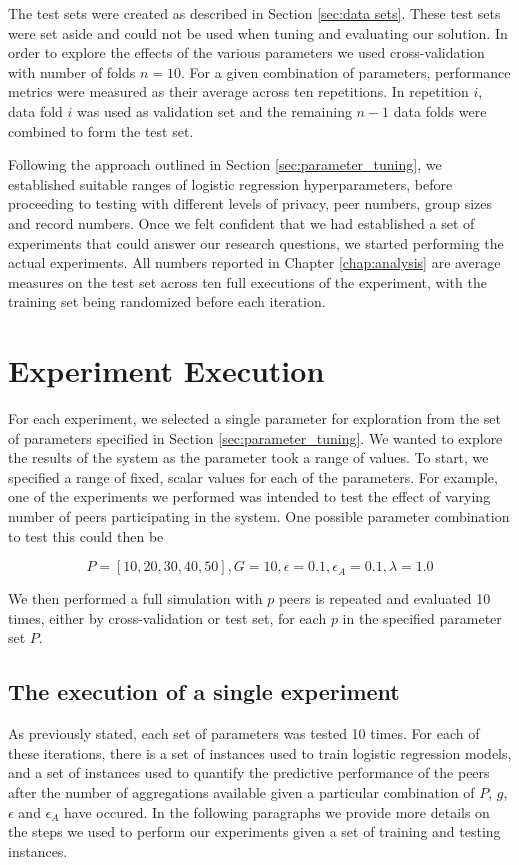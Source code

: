 The test sets were created as described in Section \ref{sec:data sets}. These test sets were set aside and could not be used when tuning and evaluating our solution. In order to explore the effects of the various parameters we used cross-validation with number of folds $n=10$. For a given combination of parameters, performance metrics were measured as their average across ten repetitions. In repetition $i$, data fold $i$ was used as validation set and the remaining $n-1$ data folds were combined to form the test set.

Following the approach outlined in Section \ref{sec:parameter_tuning}, we established suitable ranges of logistic regression hyperparameters, before proceeding to testing with different levels of privacy, peer numbers, group sizes and record numbers. Once we felt confident that we had established a set of experiments that could answer our research questions, we started performing the actual experiments. All numbers reported in Chapter \ref{chap:analysis} are average measures on the test set across ten full executions of the experiment, with the training set being randomized before each iteration.

\section{Experiment Execution}

For each experiment, we selected a single parameter for exploration from the set of parameters specified in Section \ref{sec:parameter_tuning}. We wanted to explore the results of the system as the parameter took a range of values. To start, we specified a range of fixed, scalar values for each of the parameters. For example, one of the experiments we performed was intended to test the effect of varying number of peers participating in the system. One possible parameter combination to test this could then be

$$P=[10, 20, 30, 40, 50], G=10, \epsilon=0.1, \epsilon_{A}=0.1, \lambda=1.0$$

We then performed a full simulation with $p$ peers is repeated and evaluated 10 times, either by cross-validation or test set, for each $p$ in the specified parameter set $P$. 

\subsection{The execution of a single experiment}

As previously stated, each set of parameters was tested 10 times. For each of these iterations, there is a set of instances used to train logistic regression models, and a set of instances used to quantify the predictive performance of the peers after the number of aggregations available given a particular combination of $P$, $g$, $\epsilon$ and $\epsilon_A$ have occured. In the following paragraphs we provide more details on the steps we used to perform our experiments given a set of training and testing instances.

